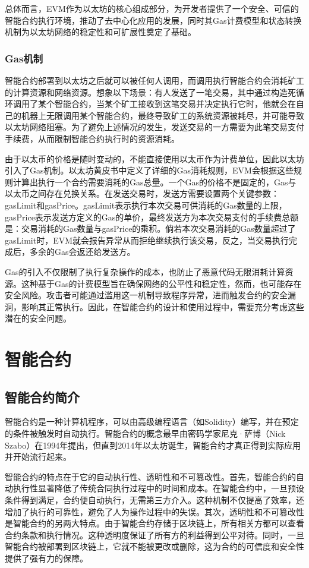     总体而言，EVM作为以太坊的核心组成部分，为开发者提供了一个安全、可信的智能合约执行环境，推动了去中心化应用的发展，同时其Gas计费模型和状态转换机制为以太坊网络的稳定性和可扩展性奠定了基础。   
    
\subsubsection{Gas机制}
    
    智能合约部署到以太坊之后就可以被任何人调用，而调用执行智能合约会消耗矿工的计算资源和网络资源。想象以下场景：有人发送了一笔交易，其中通过构造死循环调用了某个智能合约，当某个矿工接收到这笔交易并决定执行它时，他就会在自己的机器上无限调用某个智能合约，最终导致矿工的系统资源被耗尽，并可能导致以太坊网络阻塞。为了避免上述情况的发生，发送交易的一方需要为此笔交易支付手续费，从而限制智能合约执行时的资源消耗。

    由于以太币的价格是随时变动的，不能直接使用以太币作为计费单位，因此以太坊引入了Gas机制。以太坊黄皮书中定义了详细的Gas消耗规则，EVM会根据这些规则计算出执行一个合约需要消耗的Gas总量。一个Gas的价格不是固定的，Gas与以太币之间存在兑换关系。在发送交易时，发送方需要设置两个关键参数：gasLimit和gasPrice。gasLimit表示执行本次交易可供消耗的Gas数量的上限，gasPrice表示发送方定义的Gas的单价，最终发送方为本次交易支付的手续费总额是：交易消耗的Gas数量与gasPrice的乘积。倘若本次交易消耗的Gas数量超过了gasLimit时，EVM就会报告异常从而拒绝继续执行该交易，反之，当交易执行完成后，多余的Gas会返还给发送方。

    Gas的引入不仅限制了执行复杂操作的成本，也防止了恶意代码无限消耗计算资源。这种基于Gas的计费模型旨在确保网络的公平性和稳定性，然而，也可能存在安全风险。攻击者可能通过滥用这一机制导致程序异常，进而触发合约的安全漏洞，影响其正常执行。因此，在智能合约的设计和使用过程中，需要充分考虑这些潜在的安全问题。

\section{智能合约}
\label{sec:智能合约}
\subsection{智能合约简介}
\label{sec:智能合约简介}
智能合约是一种计算机程序，可以由高级编程语言（如Solidity）编写，并在预定的条件被触发时自动执行。智能合约的概念最早由密码学家尼克·萨博（Nick Szabo）在1994年提出，但直到2014年以太坊诞生，智能合约才真正得到实际应用并开始流行起来。

智能合约的特点在于它的自动执行性、透明性和不可篡改性。首先，智能合约的自动执行性显著降低了传统合同执行过程中的时间和成本。在智能合约中，一旦预设条件得到满足，合约便自动执行，无需第三方介入。这种机制不仅提高了效率，还增加了执行的可靠性，避免了人为操作过程中的失误。其次，透明性和不可篡改性是智能合约的另两大特点。由于智能合约存储于区块链上，所有相关方都可以查看合约条款和执行情况。这种透明度保证了所有方的利益得到公平对待。同时，一旦智能合约被部署到区块链上，它就不能被更改或删除，这为合约的可信度和安全性提供了强有力的保障。

